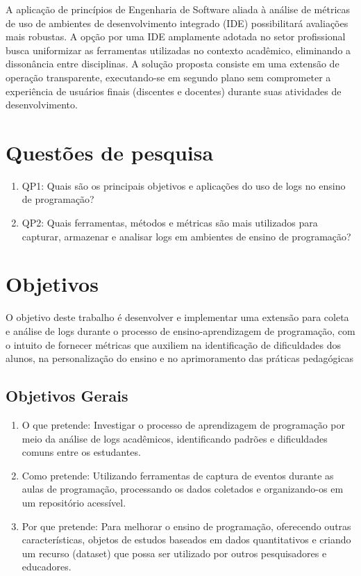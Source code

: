 A aplicação de princípios de Engenharia de Software aliada à análise de 
métricas de uso de ambientes de desenvolvimento integrado (IDE) 
possibilitará avaliações mais robustas. A opção por uma IDE amplamente 
adotada no setor profissional busca uniformizar as ferramentas 
utilizadas no contexto acadêmico, eliminando a dissonância entre 
disciplinas. A solução proposta consiste em uma extensão de operação 
transparente, executando-se em segundo plano sem comprometer a 
experiência de usuários finais (discentes e docentes) durante suas 
atividades de desenvolvimento.

\section{Questões de pesquisa}\label{sec:questoes-de-pesquisas}
\begin{enumerate}
    \item QP1: Quais são os principais objetivos e aplicações do uso de logs no ensino de programação?
    \item QP2: Quais ferramentas, métodos e métricas são mais utilizados para capturar, armazenar e analisar logs em ambientes de ensino de programação?
\end{enumerate}
\section{Objetivos} \label{sec:objetivos}

O objetivo deste trabalho é desenvolver e implementar uma extensão para coleta e análise de logs 
durante o processo de ensino-aprendizagem de programação, com o intuito de fornecer métricas que 
auxiliem na identificação de dificuldades dos alunos, na personalização do ensino e no 
aprimoramento das práticas pedagógicas

\subsection{Objetivos Gerais} \label{subsec:objetivos-gerais}
\begin{enumerate}
	\item O que pretende: Investigar o processo de aprendizagem de 
    programação por meio da análise de logs acadêmicos, identificando 
    padrões e dificuldades comuns entre os estudantes.
	\item Como pretende: Utilizando ferramentas de captura de 
    eventos durante as aulas de programação, processando os dados 
    coletados e organizando-os em um repositório acessível.
	\item Por que pretende: Para melhorar o ensino de programação, 
    oferecendo outras características, objetos de estudos baseados em 
    dados quantitativos e criando um recurso (dataset) que possa ser 
    utilizado por outros pesquisadores e educadores.
\end{enumerate}
